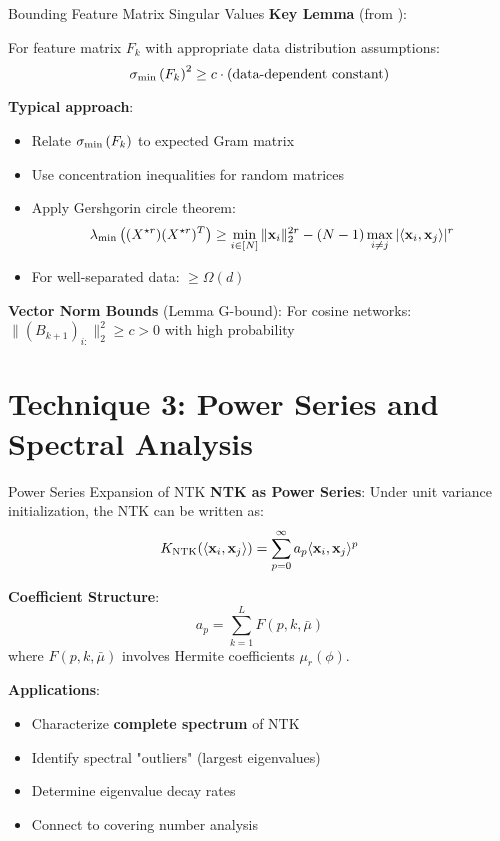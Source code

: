 \begin{frame}{Bounding Feature Matrix Singular Values}
  \textbf{Key Lemma} (from \cite{QuynhNTK2021}):
  
  For feature matrix $F_k$ with appropriate data distribution assumptions:
  $$\sigma_{\rm min}\left(F_k\right)^2 \geq c \cdot \text{(data-dependent constant)}$$
  
  \textbf{Typical approach}:
  \begin{itemize}[<+->]
    \item Relate $\sigma_{\rm min}\left(F_k\right)$ to expected Gram matrix
    \item Use concentration inequalities for random matrices
    \item Apply Gershgorin circle theorem:
    $$\lambda_{\rm min}\left((X^{\star r})(X^{\star r})^T\right) \geq \min_{i \in [N]} \|\mathbf{x}_i\|_2^{2r} - (N-1) \max_{i \neq j} |\langle \mathbf{x}_i, \mathbf{x}_j \rangle|^r$$
    \item For well-separated data: $\geq \Omega(d)$
  \end{itemize}
  
  \textbf{Vector Norm Bounds} (Lemma G-bound):
  For cosine networks: $\|(B_{k+1})_{i:}\|_2^2 \geq c > 0$ with high probability
\end{frame}

\section{Technique 3: Power Series and Spectral Analysis}

\begin{frame}{Power Series Expansion of NTK}
  \textbf{NTK as Power Series}:
  Under unit variance initialization, the NTK can be written as:
  $$K_{\text{NTK}}(\langle \mathbf{x}_i, \mathbf{x}_j \rangle) = \sum_{p=0}^{\infty} a_p \langle \mathbf{x}_i, \mathbf{x}_j \rangle^p$$
  
  \textbf{Coefficient Structure}:
  $$a_p = \sum_{k=1}^L F(p, k, \bar{\mu})$$
  where $F(p,k,\bar{\mu})$ involves Hermite coefficients $\mu_r(\phi)$.
  
  \textbf{Applications}:
  \begin{itemize}[<+->]
    \item Characterize \textbf{complete spectrum} of NTK
    \item Identify spectral "outliers" (largest eigenvalues)
    \item Determine eigenvalue decay rates
    \item Connect to covering number analysis
  \end{itemize}
\end{frame}

